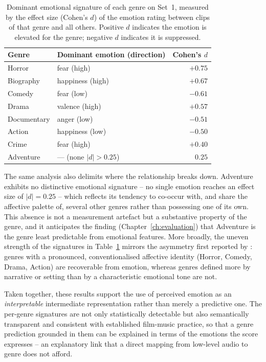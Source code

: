 \begin{table}[t]
  \centering
  \caption{Dominant emotional signature of each genre on Set~1, measured by the effect
    size (Cohen's $d$) of the emotion rating between clips of that genre and all others.
    Positive $d$ indicates the emotion is elevated for the genre; negative $d$ indicates
    it is suppressed.}
  \label{tab:emotion_genre_signatures}
  \begin{tabular}{llr}
    \hline
    Genre       & Dominant emotion (direction) & Cohen's $d$ \\
    \hline
    Horror      & fear (high)          & $+0.75$ \\
    Biography   & happiness (high)     & $+0.67$ \\
    Comedy      & fear (low)           & $-0.61$ \\
    Drama       & valence (high)       & $+0.57$ \\
    Documentary & anger (low)          & $-0.51$ \\
    Action      & happiness (low)      & $-0.50$ \\
    Crime       & fear (high)          & $+0.40$ \\
    Adventure   & --- (none $|d|>0.25$) & $\phantom{+}0.25$ \\
    \hline
  \end{tabular}
\end{table}

The same analysis also delimits where the relationship breaks down. Adventure exhibits no
distinctive emotional signature -- no single emotion reaches an effect size of $|d|=0.25$
-- which reflects its tendency to co-occur with, and share the affective palette of,
several other genres rather than possessing one of its own. This absence is not a
measurement artefact but a substantive property of the genre, and it anticipates the
finding (Chapter~\ref{ch:evaluation}) that Adventure is the genre least predictable from
emotional features. More broadly, the uneven strength of the signatures in
Table~\ref{tab:emotion_genre_signatures} mirrors the asymmetry first reported by
\citet{austin2010characterization}: genres with a pronounced, conventionalised affective
identity (Horror, Comedy, Drama, Action) are recoverable from emotion, whereas genres
defined more by narrative or setting than by a characteristic emotional tone are not.

Taken together, these results support the use of perceived emotion as an
\emph{interpretable} intermediate representation rather than merely a predictive one. The
per-genre signatures are not only statistically detectable but also semantically
transparent and consistent with established film-music practice, so that a genre
prediction grounded in them can be explained in terms of the emotions the score expresses
-- an explanatory link that a direct mapping from low-level audio to genre does not
afford.
